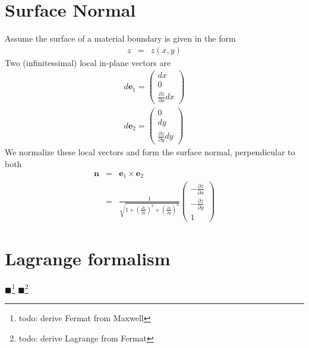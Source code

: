 \documentclass[12pt,a4paper,twoside,openright,BCOR10mm,headsepline,titlepage,abstracton,chapterprefix,final]{scrreprt}
\newcommand\Vector[1]{{\mathbf{#1}}}
\newcommand{\remark}[1]{{\color{red}$\blacksquare$}\footnote{{\color{red}#1}}}
\begin{document}
\section{Surface Normal}
Assume the surface of a material boundary is given in the form
\begin{eqnarray}
 z &=& z(x,y)
\end{eqnarray}
Two (infinitessimal) local in-plane vectors are 
\begin{eqnarray}
d\Vector{e}_1 = \begin{pmatrix}
                 dx \\ 0 \\ \frac{\partial z}{\partial x} dx
                \end{pmatrix}
\\
d\Vector{e}_2 = \begin{pmatrix}
                 0 \\ dy \\ \frac{\partial z}{\partial y} dy
                \end{pmatrix}
\end{eqnarray}
We normalize these local vectors and form the surface normal, perpendicular to both
\begin{eqnarray}
 \Vector{n} &=& \Vector{e}_1 \times \Vector{e}_2 \\
 &=& 
   \frac{1}{\sqrt{ 1 + \left( \frac{\partial z}{\partial x} \right)^2 + \left( \frac{\partial z}{\partial y} \right)^2 }}
   \begin{pmatrix}
    - \frac{\partial z}{\partial x} \\ - \frac{\partial z}{\partial y} \\ 1
   \end{pmatrix}
\end{eqnarray}

\section{Lagrange formalism}
\remark{todo: derive Fermat from Maxwell}
\remark{todo: derive Lagrange from Fermat}
\end{document}
